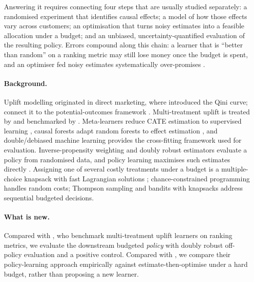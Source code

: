 \documentclass[10pt,twocolumn]{article}
\begin{document}
Answering it requires connecting four steps that are usually studied separately: a randomised
experiment that identifies causal effects; a model of how those effects vary across customers; an
optimisation that turns noisy estimates into a feasible allocation under a budget; and an unbiased,
uncertainty-quantified evaluation of the resulting policy. Errors compound along this chain: a
learner that is ``better than random'' on a ranking metric may still lose money once the budget is
spent, and an optimiser fed noisy estimates systematically over-promises \citep{smith2006}.

\paragraph{Background.}
Uplift modelling originated in direct marketing, where \citet{radcliffe2007} introduced the Qini
curve; \citet{gutierrez2017} connect it to the potential-outcomes framework
\citep{rubin1974,imbens2015}. Multi-treatment uplift is treated by \citet{zhao2017} and benchmarked
by \citet{olaya2020}. Meta-learners reduce CATE estimation to supervised learning
\citep{kunzel2019,kennedy2023,nie2021}, causal forests adapt random forests to effect estimation
\citep{wager2018,athey2019grf}, and double/debiased machine learning \citep{chernozhukov2018} provides
the cross-fitting framework used for evaluation. Inverse-propensity weighting \citep{horvitz1952}
and doubly robust estimators \citep{robins1994,dudik2011} evaluate a policy from randomised data, and
policy learning maximises such estimates directly \citep{kitagawa2018,athey2021}. Assigning one of
several costly treatments under a budget is a multiple-choice knapsack \citep{sinha1979,kellerer2004}
with fast Lagrangian solutions \citep{everett1963}; chance-constrained programming
\citep{charnes1959} handles random costs; Thompson sampling \citep{thompson1933,russo2018,eckles2014}
and bandits with knapsacks \citep{badanidiyuru2018} address sequential budgeted decisions.

\paragraph{What is new.}
Compared with \citet{olaya2020}, who benchmark multi-treatment uplift learners on ranking metrics,
we evaluate the downstream budgeted \emph{policy} with doubly robust off-policy evaluation and a
positive control. Compared with \citet{athey2021}, we compare their policy-learning approach
empirically against estimate-then-optimise under a hard budget, rather than proposing a new
learner.
\end{document}
